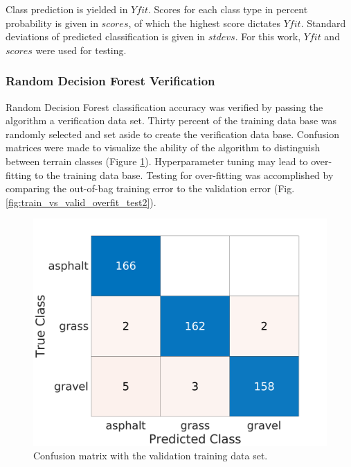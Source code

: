\documentclass[numbered,pdftex]{ohio-etd}
\begin{document}
{{{{				
				
				{Class prediction is yielded in $Yfit$. Scores for each class type in percent probability is given in $scores$, of which the highest score dictates $Yfit$. Standard deviations of predicted classification is given in $stdevs$. For this work, $Yfit$  and $scores$ were used for testing.}

				
			} %

	
			\subsubsection{Random Decision Forest Verification}\label{sec:random-decision-forest-verification}{
			
				{Random Decision Forest classification accuracy was verified by passing the algorithm a verification data set. Thirty percent of the training data base was randomly selected and set aside to create the verification data base. Confusion matrices were made to visualize the ability of the algorithm to distinguish between terrain classes (Figure \ref{fig:vali_err_conf_mat}). Hyperparameter tuning may lead to over-fitting to the training data base. Testing for over-fitting was accomplished by comparing the out-of-bag training error to the validation error (Fig. \ref{fig:train_vs_valid_overfit_test2}). }
								
				\begin{figure}[H]
					\centering
					\includegraphics[width=0.75\linewidth]{Defense_Images/chan_2c_conf_VALIDATION_mat222}
					\caption[Validation Error]{Confusion matrix with the validation training data set.}
					\label{fig:vali_err_conf_mat}
				\end{figure}
			
}}}}
\end{document}
